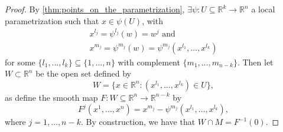 \documentclass[notoc,notitlepage]{tufte-book}
\begin{document}
\begin{proof}
  By \cref{thm:points_on_the_parametrization}, $\exists \psi : U \subseteq
  \mathbb{R}^k \to \mathbb{R}^n$ a local parametrization such that $x \in
  \psi(U)$, with
  \begin{gather*}
    x^{l_j} = \psi^{l_j}(w) = w^j \text{ and } \\
    x^{m_j} = \psi^{m_j}(w) = \psi^{m_j}(x^{l_1}, \ldots, x^{l_k})
  \end{gather*}
  for some $\{ l_1, \ldots, l_k \} \subseteq \{ 1, \ldots, n \}$ with complement
  $\{ m_1, \ldots, m_{n - k} \}$. Then let $W \subset \mathbb{R}^n$ be the open
  set defined by
  \begin{equation*}
    W = \{ x \in \mathbb{R}^n : (x^{l_1}, \ldots, x^{l_k}) \in U \},
  \end{equation*}
  as define the smooth map $F : W \subseteq \mathbb{R}^n \to \mathbb{R}^{n - k}$
  by
  \begin{equation*}
    F^j(x^1, \ldots, x^n) = x^{m_j} - \psi^{m_j}(x^{l_1}, \ldots, x^{l_k}),
  \end{equation*}
  where $j = 1, \ldots, n - k$. By construction, we have that $W \cap M =
  F^{-1}(0)$.


\end{proof}
\end{document}
